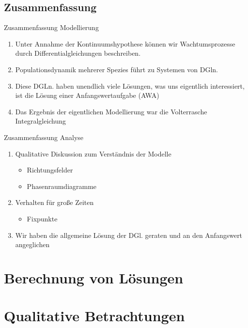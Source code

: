 \documentclass[notheorems,hidelinks,aspectratio=1610]{beamer}
\begin{document}
\subsection{Zusammenfassung}
\frame{\subtoc}

\begin{frame}{Zusammenfassung Modellierung}
  \begin{enumerate}
  \item Unter Annahme der Kontinuumshypothese können wir
    Wachtumsprozesse durch Differentialgleichungen
    beschreiben.
  \item Populationsdynamik mehrerer Spezies führt zu Systemen von DGln.
  \item Diese DGLn. haben unendlich viele Lösungen, was uns eigentlich interessiert, ist die Lösung einer Anfangswertaufgabe (AWA)
  \item Das Ergebnis der eigentlichen Modellierung war die
    Volterrasche Integralgleichung
  \end{enumerate}
\end{frame}

\begin{frame}{Zusammenfassung Analyse}
  \begin{enumerate}
  \item Qualitative Diskussion zum Verständnis der Modelle
    \begin{itemize}
    \item Richtungsfelder
    \item Phasenraumdiagramme
    \end{itemize}
  \item Verhalten für große Zeiten
    \begin{itemize}
    \item Fixpunkte
    \end{itemize}
  \item Wir haben die allgemeine Lösung der DGl. geraten und an den
    Anfangswert angeglichen
  \end{enumerate}
\end{frame}


\section{Berechnung von Lösungen}
\frame{\sectoc}

\section{Qualitative Betrachtungen}
\frame{\sectoc}
\end{document}
